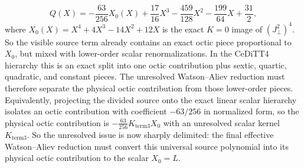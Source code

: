 \documentclass[aip,jcp,reprint,floatfix]{revtex4-2}
\begin{document}
\begin{equation}
Q(X)=
-\frac{63}{256}X_0(X)
+\frac{17}{16}X^3
-\frac{459}{128}X^2
-\frac{199}{64}X
+\frac{31}{2},
\end{equation}
where \(X_0(X)=X^4+4X^3-14X^2+12X\) is the exact \(K=0\) image of
\((J_\perp^2)^4\). So the visible source term already contains an exact octic
piece proportional to \(X_0\), but mixed with lower-order scalar
renormalizations. In the CeDiTT4 hierarchy this is an exact split into one
octic contribution plus sextic, quartic, quadratic, and constant pieces. The
unresolved Watson--Aliev reduction must therefore separate the physical octic
contribution from those lower-order pieces.
Equivalently, projecting the divided source onto the exact linear scalar
hierarchy isolates an octic contribution with coefficient
\(-63/256\) in normalized form, so the physical octic contribution is
\(-\frac{63}{256}K_{\mathrm{term3}}X_0\) with an unresolved scalar kernel
\(K_{\mathrm{term3}}\).
So the unresolved issue is now sharply delimited: the final effective
Watson--Aliev reduction must convert this universal source polynomial into its
physical octic contribution to the scalar \(X_0=L\).
\end{document}
